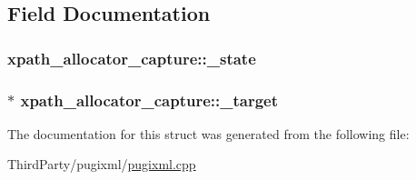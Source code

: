 \subsection{Field Documentation}
\hypertarget{structxpath__allocator__capture_a275859dc99681c12b42ee4f51b713d39}{
\subsubsection[{\-\_\-state}]{ xpath\-\_\-allocator\-\_\-capture\-::\-\_\-state}}\label{structxpath__allocator__capture_a275859dc99681c12b42ee4f51b713d39}
\hypertarget{structxpath__allocator__capture_a382acca931c691699ec84a03fb060cf4}{
\subsubsection[{\-\_\-target}]{$\ast$ xpath\-\_\-allocator\-\_\-capture\-::\-\_\-target}}\label{structxpath__allocator__capture_a382acca931c691699ec84a03fb060cf4}


The documentation for this struct was generated from the following file\-:\begin{DoxyCompactItemize}
\item 
Third\-Party/pugixml/\hyperlink{pugixml_8cpp}{pugixml.\-cpp}\end{DoxyCompactItemize}
